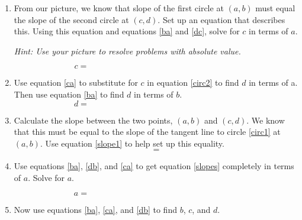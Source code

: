 \documentclass[11pt]{article}
\begin{document}
\begin{enumerate}
  \newpage
  
\item From our picture, we know that slope of the first circle at
  $(a,b)$ must equal the slope of the second circle at $(c,d)$.  Set
  up an equation that describes this.  Using this equation and
  equations \ref{ba} and \ref{dc}, solve for $c$ in terms of
  $a$. 
  
  \textit{Hint: Use your picture to resolve problems with absolute
    value.}
  
  
  \vfill
  
  \begin{equation}\label{ca}
    c = \hspace{3in}
  \end{equation}
  
  \newpage
  
\item Use equation \ref{ca} to substitute for $c$ in equation
  \ref{circ2} to find $d$ in terms of a.  Then use equation \ref{ba}
  to find $d$ in terms of $b$.
  \vfill
  \begin{equation}\label{db}
    d =\hspace{3in}
  \end{equation}
\item Calculate the slope between the two points, $(a,b)$ and
  $(c,d)$.  We know that this must be equal to the slope of the
  tangent line to circle \ref{circ1} at $(a,b)$.  Use equation
  \ref{slope1} to help set up this equality.
  \vfill
  \begin{equation}\label{slopes}
    =
  \end{equation}
  \newpage
  
\item Use equations \ref{ba}, \ref{db}, and \ref{ca} to get equation
  \ref{slopes} completely in terms of $a$.  Solve for $a$.
  
  \vfill
  
  \begin{equation}\label{a}
    a = \hspace{3in}
  \end{equation}
  
\item Now use equations \ref{ba}, \ref{ca}, and \ref{db} to find
  $b$, $c$, and $d$.
  
  \vfill
  
\end{enumerate}
\end{document}
